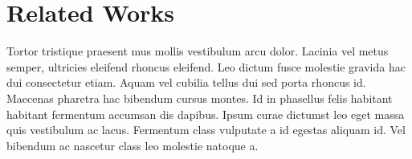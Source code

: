 \section{Related Works}
\label{sec:related}

Tortor tristique praesent mus mollis vestibulum arcu dolor. Lacinia vel metus
semper, ultricies eleifend rhoncus eleifend. Leo dictum fusce molestie gravida
hac dui consectetur etiam. Aquam vel cubilia tellus dui sed porta rhoncus id.
Maecenas pharetra hac bibendum cursus montes. Id in phasellus felis habitant
habitant fermentum accumsan dis dapibus. Ipsum curae dictumst leo eget massa
quis vestibulum ac lacus. Fermentum class vulputate a id egestas aliquam id.
Vel bibendum ac nascetur class leo molestie natoque a.
